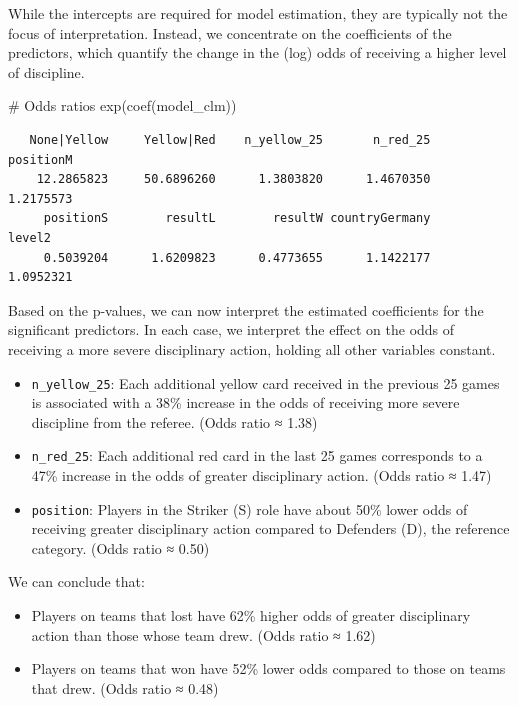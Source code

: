 \documentclass[
  letterpaper,
  DIV=11,
  numbers=noendperiod]{scrartcl}
\newenvironment{Shaded}{\begin{snugshade}}{\end{snugshade}}
\newcommand{\CommentTok}[1]{\textcolor[rgb]{0.37,0.37,0.37}{#1}}
\newcommand{\FunctionTok}[1]{\textcolor[rgb]{0.28,0.35,0.67}{#1}}
\newcommand{\NormalTok}[1]{\textcolor[rgb]{0.00,0.23,0.31}{#1}}
\begin{document}
While the intercepts are required for model estimation, they are
typically not the focus of interpretation. Instead, we concentrate on
the coefficients of the predictors, which quantify the change in the
(log) odds of receiving a higher level of discipline.

\begin{Shaded}
\begin{Highlighting}[]
\CommentTok{\# Odds ratios}
\FunctionTok{exp}\NormalTok{(}\FunctionTok{coef}\NormalTok{(model\_clm))}
\end{Highlighting}
\end{Shaded}

\begin{verbatim}
   None|Yellow     Yellow|Red    n_yellow_25       n_red_25      positionM 
    12.2865823     50.6896260      1.3803820      1.4670350      1.2175573 
     positionS        resultL        resultW countryGermany         level2 
     0.5039204      1.6209823      0.4773655      1.1422177      1.0952321 
\end{verbatim}

Based on the p-values, we can now interpret the estimated coefficients
for the significant predictors. In each case, we interpret the effect on
the odds of receiving a more severe disciplinary action, holding all
other variables constant.

\begin{itemize}
\item
  \texttt{n\_yellow\_25}: Each additional yellow card received in the
  previous 25 games is associated with a 38\% increase in the odds of
  receiving more severe discipline from the referee. (Odds ratio ≈ 1.38)
\item
  \texttt{n\_red\_25}: Each additional red card in the last 25 games
  corresponds to a 47\% increase in the odds of greater disciplinary
  action. (Odds ratio ≈ 1.47)
\item
  \texttt{position}: Players in the Striker (S) role have about 50\%
  lower odds of receiving greater disciplinary action compared to
  Defenders (D), the reference category. (Odds ratio ≈ 0.50)
\end{itemize}

We can conclude that:

\begin{itemize}
\item
  Players on teams that lost have 62\% higher odds of greater
  disciplinary action than those whose team drew. (Odds ratio ≈ 1.62)
\item
  Players on teams that won have 52\% lower odds compared to those on
  teams that drew. (Odds ratio ≈ 0.48)
\end{itemize}
\end{document}
